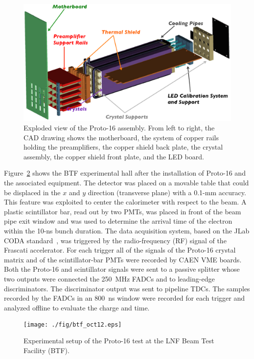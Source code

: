 \begin{figure}
\includegraphics[width=1.0\columnwidth]{./fig/p16-whole.eps}
\caption{Exploded view of the Proto-16 assembly. From left to right, the CAD drawing shows the motherboard, the
  system of copper rails holding the preamplifiers, the copper shield back plate, the crystal assembly, the copper
  shield front plate, and the LED board.}
\label{fig:p16-whole}
\end{figure}

Figure~\ref{fig:btf} shows the BTF experimental hall after the installation of Proto-16 and the associated equipment.
The detector was placed on a movable table that could be displaced in the $x$ and $y$ direction (transverse
plane) with a 0.1-mm accuracy. This feature was exploited to center the calorimeter with respect to the beam. A
plastic scintillator bar, read out by two PMTs, was placed in front of the beam pipe exit window and was used to
determine the arrival time of the electron within the 10-ns bunch duration. The data acquisition system, based on the
JLab CODA standard~\cite{daq}, was triggered by the radio-frequency (RF) signal of the Frascati accelerator. For
each trigger all of the signals of the Proto-16 crystal matrix and of the scintillator-bar PMTs were recorded by
CAEN VME boards. Both the Proto-16 and scintillator signals were sent to a passive splitter whose two outputs were
connected the 250~MHz FADCs and to leading-edge discriminators. The discriminator output was sent to pipeline
TDCs. The samples recorded by the FADCs in an 800~ns window were recorded for each trigger and analyzed offline
to evaluate the charge and time.

\begin{figure}
\texttt{[image: ./fig/btf\_oct12.eps]}
\caption{Experimental setup of the Proto-16 test at the LNF Beam Test Facility (BTF).}
\label{fig:btf}
\end{figure}

